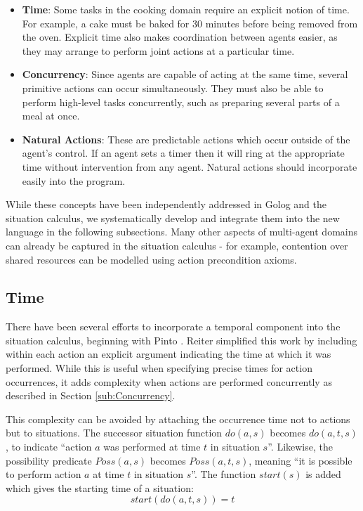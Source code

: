 \documentclass[letterpaper]{article}
\begin{document}
\begin{itemize}
\item \textbf{Time}: Some tasks in the cooking domain require an explicit
notion of time. For example, a cake must be baked for 30 minutes before
being removed from the oven. Explicit time also makes coordination
between agents easier, as they may arrange to perform joint actions
at a particular time.
\item \textbf{Concurrency}: Since agents are capable of acting at the same
time, several primitive actions can occur simultaneously. They must
also be able to perform high-level tasks concurrently, such as preparing
several parts of a meal at once.
\item \textbf{Natural Actions}: These are predictable actions which occur
outside of the agent's control. If an agent sets a timer then it will
ring at the appropriate time without intervention from any agent.
Natural actions should incorporate easily into the program.
\end{itemize}
While these concepts have been independently addressed in Golog and
the situation calculus, we systematically develop and integrate them
into the new language in the following subsections. Many other aspects
of multi-agent domains can already be captured in the situation calculus
- for example, contention over shared resources can be modelled using
action precondition axioms.


\subsection{Time}

There have been several efforts to incorporate a temporal component
into the situation calculus, beginning with Pinto \cite{pinto94temporal}.
Reiter \cite{reiter96sc_nat_conc} simplified this work by including
within each action an explicit argument indicating the time at which
it was performed. While this is useful when specifying precise times
for action occurrences, it adds complexity when actions are performed
concurrently as described in Section \ref{sub:Concurrency}.

This complexity can be avoided by attaching the occurrence time not
to actions but to situations. The successor situation function $do(a,s)$
becomes $do(a,t,s)$, to indicate ``action $a$ was performed at
time $t$ in situation $s$''. Likewise, the possibility predicate
$Poss(a,s)$ becomes $Poss(a,t,s)$, meaning ``it is possible to
perform action $a$ at time $t$ in situation $s$''. The function
$start(s)$ is added which gives the starting time of a situation:
\begin{equation}
start(do(a,t,s))=t
\end{equation}
\end{document}
